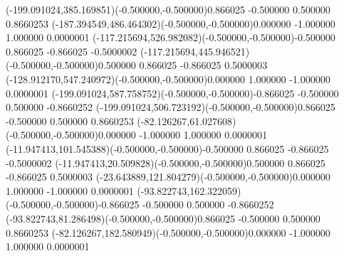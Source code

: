 \ASYalignT(-199.091024,385.169851)(-0.500000,-0.500000){0.866025 -0.500000 0.500000 0.866025}{3}%
\color{ASYcolor}
\fontsize{12.000000}{14.400000}\selectfont
\ASYalignT(-187.394549,486.464302)(-0.500000,-0.500000){0.000000 -1.000000 1.000000 0.000000}{1}%
\color{ASYcolor}
\fontsize{12.000000}{14.400000}\selectfont
\ASYalignT(-117.215694,526.982082)(-0.500000,-0.500000){-0.500000 0.866025 -0.866025 -0.500000}{2}%
\color{ASYcolor}
\fontsize{12.000000}{14.400000}\selectfont
\ASYalignT(-117.215694,445.946521)(-0.500000,-0.500000){0.500000 0.866025 -0.866025 0.500000}{3}%
\color{ASYcolor}
\fontsize{12.000000}{14.400000}\selectfont
\ASYalignT(-128.912170,547.240972)(-0.500000,-0.500000){0.000000 1.000000 -1.000000 0.000000}{1}%
\color{ASYcolor}
\fontsize{12.000000}{14.400000}\selectfont
\ASYalignT(-199.091024,587.758752)(-0.500000,-0.500000){-0.866025 -0.500000 0.500000 -0.866025}{2}%
\color{ASYcolor}
\fontsize{12.000000}{14.400000}\selectfont
\ASYalignT(-199.091024,506.723192)(-0.500000,-0.500000){0.866025 -0.500000 0.500000 0.866025}{3}%
\color{ASYcolor}
\fontsize{12.000000}{14.400000}\selectfont
\ASYalignT(-82.126267,61.027608)(-0.500000,-0.500000){0.000000 -1.000000 1.000000 0.000000}{1}%
\color{ASYcolor}
\fontsize{12.000000}{14.400000}\selectfont
\ASYalignT(-11.947413,101.545388)(-0.500000,-0.500000){-0.500000 0.866025 -0.866025 -0.500000}{2}%
\color{ASYcolor}
\fontsize{12.000000}{14.400000}\selectfont
\ASYalignT(-11.947413,20.509828)(-0.500000,-0.500000){0.500000 0.866025 -0.866025 0.500000}{3}%
\color{ASYcolor}
\fontsize{12.000000}{14.400000}\selectfont
\ASYalignT(-23.643889,121.804279)(-0.500000,-0.500000){0.000000 1.000000 -1.000000 0.000000}{1}%
\color{ASYcolor}
\fontsize{12.000000}{14.400000}\selectfont
\ASYalignT(-93.822743,162.322059)(-0.500000,-0.500000){-0.866025 -0.500000 0.500000 -0.866025}{2}%
\color{ASYcolor}
\fontsize{12.000000}{14.400000}\selectfont
\ASYalignT(-93.822743,81.286498)(-0.500000,-0.500000){0.866025 -0.500000 0.500000 0.866025}{3}%
\color{ASYcolor}
\fontsize{12.000000}{14.400000}\selectfont
\ASYalignT(-82.126267,182.580949)(-0.500000,-0.500000){0.000000 -1.000000 1.000000 0.000000}{1}%
